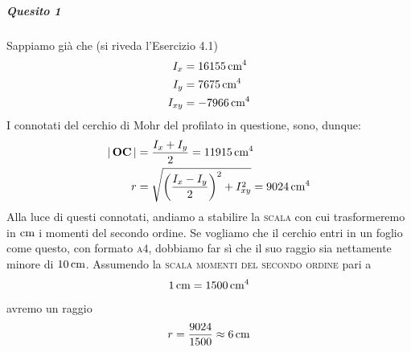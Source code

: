 \noindent \subparagraph{Quesito 1}  Sappiamo già che (si riveda l'Esercizio 4.1)
\begin{align*}
I_x &= 16155\,\textup{cm}^{4} \\
I_y &= 7675\,\textup{cm}^{4} \\
I_{xy} &= -7966\,\textup{cm}^{4}
\end{align*}
I connotati del cerchio di Mohr del profilato in questione, sono, dunque:
\begin{align*}
\lvert \, \mathbf{O}\mathbf{C}\,\lvert &= \frac{I_{x}+I_{y}}{2} = 11915\,\textup{cm}^{4} \\
r &= \sqrt{\biggl(\frac{I_{x}-I_{y}}{2}\biggr)^{2}+I_{xy}^{2}} = 9024\,\textup{cm}^{4}
\end{align*}
Alla luce di questi connotati, andiamo a stabilire la \textsc{scala} con cui trasformeremo in $\textup{cm}$ i momenti del secondo ordine. Se vogliamo che il cerchio entri in un foglio come questo, con formato \textsc{a}$4$, dobbiamo far sì che il suo raggio sia nettamente minore di $10\,\textup{cm}$. Assumendo la \textsc{scala momenti del secondo ordine} pari a
\begin{equation*}
1\,\textup{cm} = 1500\,\textup{cm}^{4}
\end{equation*}
avremo un raggio
\begin{equation*}
r = \frac{9024}{1500} \approx 6\,\textup{cm}
\end{equation*}
